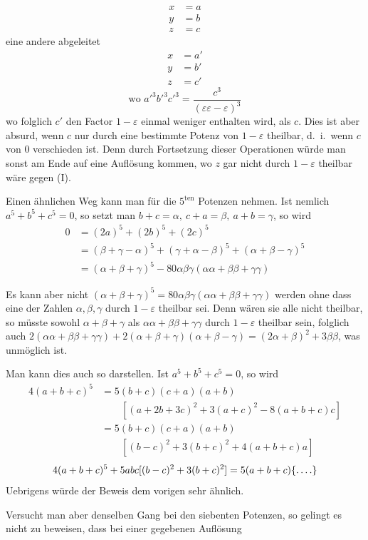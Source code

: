 %
\[
\begin{aligned}
x&=a\\
y&=b\\
z&=c
\end{aligned}
\]
eine andere abgeleitet
\[
\begin{aligned}
x&=a'\\
y&=b'\\
z&=c'
\end{aligned}
\]
\[
\text{wo }a'^3b'^3c'^3=\frac{c^3}{(\varepsilon\varepsilon-\varepsilon)^3}
\]
wo folglich $c'$ den Factor $1-\varepsilon$ einmal weniger enthalten wird, als $c$. Dies ist aber absurd, wenn $c$ nur durch eine bestimmte Potenz von $1-\varepsilon$ theilbar, d.\ i.\ wenn $c$ von $0$ verschieden ist. Denn durch Fortsetzung dieser Operationen würde man sonst am Ende auf eine Auflösung kommen, wo $z$ gar nicht durch $1-\varepsilon$ theilbar wäre gegen (I).

Einen ähnlichen Weg kann man für die $5^{\mathrm{ten}}$ Potenzen nehmen. Ist nemlich $a^5+b^5+c^5=0$, so setzt man $b+c=\alpha,\ c+a=\beta,\ a+b=\gamma$, so wird
\[
\begin{aligned}
0&=(2a)^5+(2b)^5+(2c)^5\\
&=(\beta+\gamma-\alpha)^5+(\gamma+\alpha-\beta)^5+(\alpha+\beta-\gamma)^5\\
&=(\alpha+\beta+\gamma)^5-80\alpha\beta\gamma(\alpha\alpha+\beta\beta+\gamma\gamma)
\end{aligned}
\]

Es kann aber nicht $(\alpha+\beta+\gamma)^5=80\alpha\beta\gamma(\alpha\alpha+\beta\beta+\gamma\gamma)$ werden ohne dass eine der Zahlen $\alpha,\beta,\gamma$ durch $1-\varepsilon$ theilbar sei. Denn wären sie alle nicht theilbar, so müsste sowohl $\alpha+\beta+\gamma$ als $\alpha\alpha+\beta\beta+\gamma\gamma$ durch $1-\varepsilon$ theilbar sein, folglich auch $2(\alpha\alpha+\beta\beta+\gamma\gamma)+2(\alpha+\beta+\gamma)(\alpha+\beta-\gamma)=(2\alpha+\beta)^2+3\beta\beta$, was unmöglich ist.

Man kann dies auch so darstellen. Ist $a^5+b^5+c^5=0$, so wird
\[
\begin{aligned}
4(a+b+c)^5&=5(b+c)(c+a)(a+b)\\
&\qquad[(a+2b+3c)^2+3(a+c)^2-8(a+b+c)c]\\
&=5(b+c)(c+a)(a+b)\\
&\qquad[(b-c)^2+3(b+c)^2+4(a+b+c)a]
\end{aligned}
\]
\[
4(a+b+c)^5+5abc[(b-c)^2+3(b+c)^2]=5(a+b+c)\{\mathinner{.\,.\,.\,.}\}
\]
Uebrigens würde der Beweis dem vorigen sehr ähnlich.

Versucht man aber denselben Gang bei den siebenten Potenzen, so gelingt es nicht zu beweisen, dass bei einer gegebenen Auflösung
